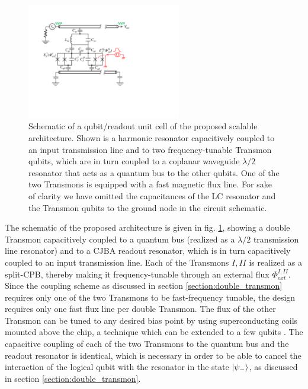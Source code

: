 \begin{figure}
	\centering
	\includegraphics[width=0.6\textwidth]{./material/figures/scalable-architecture/double_transmon_architecture_schematic}
	\caption[]{Schematic of a qubit/readout unit cell of the proposed scalable architecture. Shown is a harmonic resonator capacitively coupled to an input transmission line and to two frequency-tunable Transmon qubits, which are in turn coupled to a coplanar waveguide $\lambda/2$ resonator that acts as a quantum bus to the other qubits. One of the two Transmons is equipped with a fast magnetic flux line. For sake of clarity we have omitted the capacitances of the LC resonator and the Transmon qubits to the ground node in the circuit schematic.}
	\label{fig:scalable_architecture_schematic}
\end{figure}

The schematic of the proposed architecture is given in fig. \ref{fig:scalable_architecture_schematic}, showing a double Transmon capacitively coupled to a quantum bus (realized as a $\lambda/2$ transmission line resonator) and to a CJBA readout resonator, which is in turn capacitively coupled to an input transmission line. Each of the Transmons $I,II$ is realized as a split-CPB, thereby making it frequency-tunable through an external flux $\Phi_{ext}^{I,II}$. Since the coupling scheme as discussed in section \ref{section:double_transmon} requires only one of the two Transmons to be fast-frequency tunable, the design requires only one fast flux line per double Transmon. The flux of the other Transmon can be tuned to any desired bias point by using superconducting coils mounted above the chip, a technique which can be extended to a few qubits \citep{baur_realizing_2012}. The capacitive coupling of each of the two Transmons to the quantum bus and the readout resonator is identical, which is necessary in order to be able to cancel the interaction of the logical qubit with the resonator in the state $\left| \psi_- \right>$, as discussed in section \ref{section:double_transmon}. 

